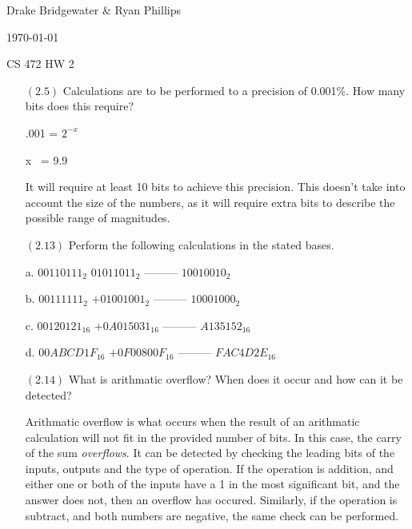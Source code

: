 \documentclass[letterpaper,12pt,titlepage]{article}
\def\name{Drake Bridgewater \& Ryan Phillips}
\begin{document}
\hfill \name

\hfill \today

\hfill CS 472 HW 2

\begin{enumerate}

\item[$(2.5)$] Calculations are to be performed to a precision of 0.001\%. How many bits does this require?
  
.001 = $2^{-x}$

x ~= 9.9

It will require at least 10 bits to achieve this precision. This doesn't take into account the size of the numbers, as it will require extra bits to describe the possible range of magnitudes.

\item[$(2.13)$] Perform the following calculations in the stated bases.



a. \newline
$00110111_{2}$ \newline
$01011011_{2}$ \newline
--------- \newline
$10010010_{2}$ \newline 


b. \newline
$00111111_{2}$ \newline
$ + 01001001_{2}$ \newline
--------- \newline
$10001000_{2}$ \newline

c. \newline
$00120121_{16}$ \newline
$ + 0A015031_{16}$ \newline
--------- \newline
$A135152_{16}$ \newline

d. \newline
$00ABCD1F_{16}$ \newline
$ + 0F00800F_{16}$ \newline
--------- \newline
$FAC4D2E_{16}$ \newline
  
\item[$(2.14)$] What is arithmatic overflow? When does it occur and how can it be detected?
  
Arithmatic overflow is what occurs when the result of an arithmatic calculation will not fit in the provided number of bits. In this case, the carry of the sum \textit{overflows}. It can be detected by checking the leading bits of the inputs, outputs and the type of operation. If the operation is addition, and either one or both of the inputs have a 1 in the most significant bit, and the answer does not, then an overflow has occured. Similarly, if the operation is subtract, and both numbers are negative, the same check can be performed.


\end{enumerate}
\end{document}

